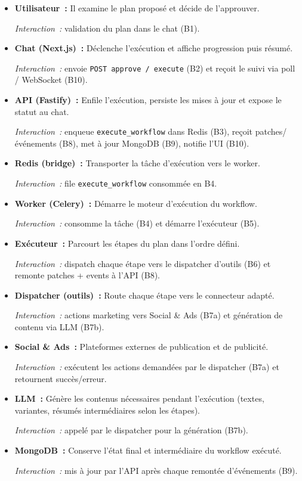 \documentclass[12pt,a4paper]{report}
\numberwithin{figure}{chapter}
\numberwithin{table}{chapter}
\begin{document}
\begin{itemize}[leftmargin=2em,itemsep=6pt]

\item \textbf{Utilisateur~:}
Il examine le plan proposé et décide de l’approuver.

\textit{Interaction~:} validation du plan dans le chat (B1).

\item \textbf{Chat (Next.js)~:}
Déclenche l’exécution et affiche progression puis résumé.

\textit{Interaction~:} envoie \texttt{POST approve / execute} (B2) et reçoit le suivi via poll / WebSocket (B10).

\item \textbf{API (Fastify)~:}
Enfile l’exécution, persiste les mises à jour et expose le statut au chat.

\textit{Interaction~:} enqueue \texttt{execute\_workflow} dans Redis (B3), reçoit patches/événements (B8), met à jour MongoDB (B9), notifie l’UI (B10).

\item \textbf{Redis (bridge)~:}
Transporter la tâche d’exécution vers le worker.

\textit{Interaction~:} file \texttt{execute\_workflow} consommée en B4.

\item \textbf{Worker (Celery)~:}
Démarre le moteur d’exécution du workflow.

\textit{Interaction~:} consomme la tâche (B4) et démarre l’exécuteur (B5).

\item \textbf{Exécuteur~:}
Parcourt les étapes du plan dans l’ordre défini.

\textit{Interaction~:} dispatch chaque étape vers le dispatcher d’outils (B6) et remonte patches + events à l’API (B8).

\item \textbf{Dispatcher (outils)~:}
Route chaque étape vers le connecteur adapté.

\textit{Interaction~:} actions marketing vers Social \& Ads (B7a) et génération de contenu via LLM (B7b).

\item \textbf{Social \& Ads~:}
Plateformes externes de publication et de publicité.

\textit{Interaction~:} exécutent les actions demandées par le dispatcher (B7a) et retournent succès/erreur.

\item \textbf{LLM~:}
Génère les contenus nécessaires pendant l’exécution (textes, variantes, résumés intermédiaires selon les étapes).

\textit{Interaction~:} appelé par le dispatcher pour la génération (B7b).

\item \textbf{MongoDB~:}
Conserve l’état final et intermédiaire du workflow exécuté.

\textit{Interaction~:} mis à jour par l’API après chaque remontée d’événements (B9).

\end{itemize}
\end{document}
